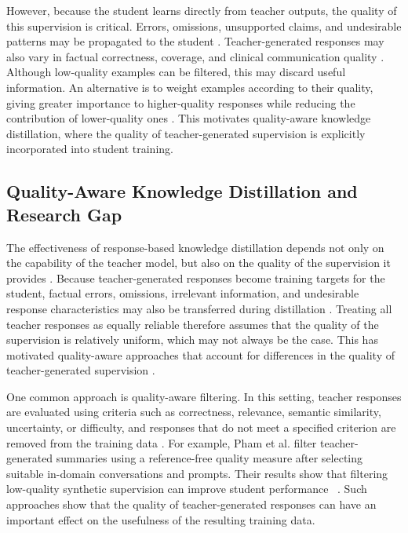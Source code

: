 \documentclass[ %
                    author={Aman Kumar Singh},
                supervisor={Dr. Edwin Simpson},
                    degree={MSc},
                     title={Quality-Aware Knowledge Distillation of Large Language Models for Efficient Personalised Clinical Report Generation},
                  subtitle={},
                      type={},
                      year={2021}]{dissertation}
\begin{document}
However, because the student learns directly from teacher outputs, the quality
of this supervision is critical. Errors, omissions, unsupported claims, and
undesirable patterns may be propagated to the student
\cite{zhang_lifting_2023,montenegro_what_2025}. Teacher-generated responses
may also vary in factual correctness, coverage, and clinical communication
quality \cite{davidson_reasoning-driven_2026}. Although low-quality examples
can be filtered, this may discard useful information. An alternative is to
weight examples according to their quality, giving greater importance to
higher-quality responses while reducing the contribution of lower-quality ones
\cite{kuo_not_2025}. This motivates quality-aware knowledge distillation,
where the quality of teacher-generated supervision is explicitly incorporated
into student training.

\subsection{Quality-Aware Knowledge Distillation and Research Gap}
\label{sec:quality_aware_kd_research_gap}
The effectiveness of response-based knowledge distillation depends not only on
the capability of the teacher model, but also on the quality of the supervision
it provides \cite{wen_preparing_2020}. Because teacher-generated responses become training targets for
the student, factual errors, omissions, irrelevant information, and undesirable
response characteristics may also be transferred during distillation \cite{zhang_can_2024}.
Treating all teacher responses as equally reliable therefore assumes that the
quality of the supervision is relatively uniform, which may not always be the
case. This has motivated quality-aware approaches that account for differences
in the quality of teacher-generated supervision
\cite{alba_honest_2026}.

One common approach is quality-aware filtering. In this setting, teacher
responses are evaluated using criteria such as correctness, relevance,
semantic similarity, uncertainty, or difficulty, and responses that do not
meet a specified criterion are removed from the training data \cite{cai_when_2026, zafar_confidence-based_2025}. For example,
Pham et al. filter teacher-generated summaries using
a reference-free quality measure after selecting suitable in-domain
conversations and prompts. Their results show that filtering low-quality
synthetic supervision can improve student performance ~\cite{pham_select_2023}. Such approaches show
that the quality of teacher-generated responses can have an important effect
on the usefulness of the resulting training data.
\end{document}
